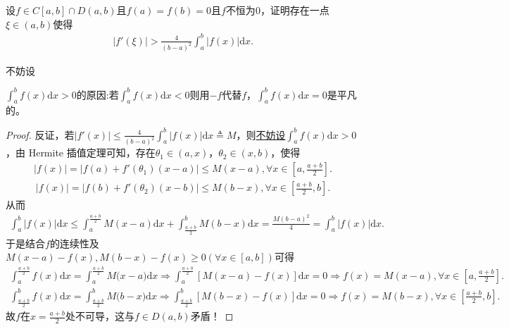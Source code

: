 \documentclass[../../main.tex]{subfiles}%
\begin{document}
\begin{example}
设\(f \in C[a,b]\cap D(a,b)\)且\(f(a) = f(b) = 0\)且\(f\)不恒为\(0\)，证明存在一点\(\xi \in (a,b)\)使得
\begin{align}
|f'(\xi)| > \frac{4}{(b - a)^2}\int_{a}^{b}\left|f(x)\right|\mathrm{d}x.\label{eq:::23523523424jrioj53313}
\end{align} 
\end{example}
\begin{remark}
\hypertarget{example0.5----:不妨设的原因}{不妨设}\(\int_{a}^{b}f(x)\mathrm{d}x > 0\)的原因:若\(\int_{a}^{b}f(x)\mathrm{d}x < 0\)则用\(-f\)代替\(f\)，\(\int_{a}^{b}f(x)\mathrm{d}x = 0\)是平凡的。
\end{remark}
\begin{proof}

反证，若\(|f'(x)| \leqslant \frac{4}{(b - a)^2}\int_{a}^{b}\left|f(x)\right| \mathrm{d}x\triangleq M\)，则\hyperlink{example0.5----:不妨设的原因}{不妨设\(\int_{a}^{b}f(x)\mathrm{d}x > 0\)}，由 Hermite 插值定理可知，存在\(\theta_1 \in (a, x)\)，\(\theta_2 \in (x, b)\)，使得
\begin{align*}
\left|f(x)\right| = \left|f(a) + f'(\theta_1)(x - a) \right|\leqslant M(x - a), \forall x \in \left[a, \frac{a + b}{2}\right].
\end{align*}
\begin{align*}
\left|f(x)\right| = \left|f(b) + f'(\theta_2)(x - b)\right| \leqslant M(b - x), \forall x \in \left[\frac{a + b}{2}, b\right].
\end{align*}
从而
\begin{align*}
\int_{a}^{b}|f(x)|\mathrm{d}x \leqslant \int_{a}^{\frac{a + b}{2}}M(x - a)\mathrm{d}x + \int_{\frac{a + b}{2}}^{b}M(b - x)\mathrm{d}x = \frac{M(b - a)^2}{4} = \int_{a}^{b}|f(x)|\mathrm{d}x.
\end{align*}
于是结合\(f\)的连续性及$M(x-a)-f(x),M(b-x)-f(x)\geqslant 0(\forall x\in [a,b])$可得
\begin{align*}
\int_a^{\frac{a+b}{2}}{f(x)\mathrm{d}x}=\int_a^{\frac{a+b}{2}}{M(x}-a)\mathrm{d}x\Longrightarrow \int_a^{\frac{a+b}{2}}{\left[ M\left( x-a \right) -f\left( x \right) \right] \mathrm{d}x}=0\Longrightarrow f(x)=M(x-a),\forall x\in \left[ a,\frac{a+b}{2} \right] .
\end{align*}
\begin{align*}
\int_{\frac{a+b}{2}}^b{f(x)\mathrm{d}x}=\int_{\frac{a+b}{2}}^b{M(b}-x)\mathrm{d}x\Longrightarrow \int_{\frac{a+b}{2}}^b{\left[ M\left( b-x \right) -f\left( x \right) \right] \mathrm{d}x}=0\Longrightarrow f(x)=M(b-x),\forall x\in \left[ \frac{a+b}{2},b \right] .
\end{align*}
故\(f\)在\(x = \frac{a + b}{2}\)处不可导，这与\(f \in D(a, b)\)矛盾！

\end{proof}
\end{document}
